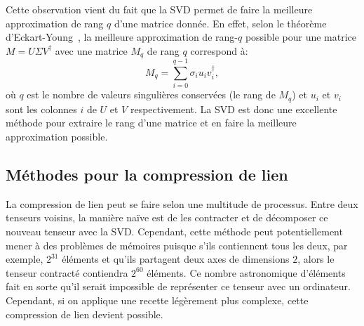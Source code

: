 Cette observation vient du fait que la SVD permet de faire la meilleure approximation de rang $q$ d'une matrice donnée.
En effet, selon le théorème d'Eckart-Young~\cite{eckart_approximation_1936, dax2014low}, la meilleure approximation de rang-$q$ possible pour une matrice $M = U \Sigma V^\dagger$ avec une matrice $M_q$ de rang $q$ correspond à:
\begin{equation}\label{eq:eckart-young}
    M_q = \sum_{i=0}^{q-1}\sigma_i u_i v^\dagger_i,
\end{equation}
où $q$ est le nombre de valeurs singulières conservées (le rang de $M_q$) et $u_i$ et $v_i$ sont les colonnes $i$ de $U$ et $V$ respectivement.
La SVD est donc une excellente méthode pour extraire le rang d'une matrice et en faire la meilleure approximation possible.

\subsection{Méthodes pour la compression de lien}\label{subsec:bond-compression}
La compression de lien peut se faire selon une multitude de processus.
Entre deux tenseurs voisins, la manière naïve est de les contracter et de décomposer ce nouveau tenseur avec la SVD.
Cependant, cette méthode peut potentiellement mener à des problèmes de mémoires puisque s'ils contiennent tous les deux, par exemple, $2^{31}$ éléments et qu'ils partagent deux axes de dimensions $2$, alors le tenseur contracté contiendra $2^{60}$ éléments.
Ce nombre astronomique d'éléments fait en sorte qu'il serait impossible de représenter ce tenseur avec un ordinateur.
Cependant, si on applique une recette légèrement plus complexe, cette compression de lien devient possible.

